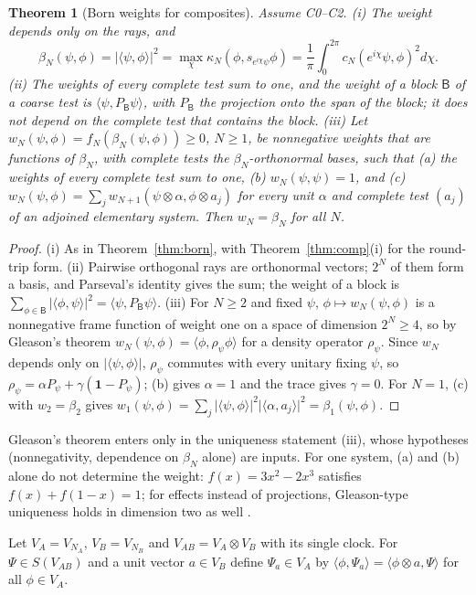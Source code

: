 \documentclass[aps,pra,onecolumn,superscriptaddress,nofootinbib,10pt]{revtex4-2}
\newtheorem{theorem}{Theorem}
\theoremstyle{definition}
\theoremstyle{remark}
\newcommand{\ip}[2]{\langle #1,#2\rangle}
\begin{document}
\begin{theorem}[Born weights for composites]\label{thm:bornN}
Assume C0--C2.
(i) The weight depends only on the rays, and
\[
\beta_N(\psi,\phi)=\lvert\ip{\psi}{\phi}\rvert^2=\max_\chi\kappa_N(\phi,s_{e^{i\chi}\psi}\phi)
=\frac1\pi\int_0^{2\pi}c_N(e^{i\chi}\psi,\phi)^2d\chi .
\]
(ii) The weights of every complete test sum to one, and the weight of a block $\mathsf B$ of a coarse
test is $\ip{\psi}{P_{\mathsf B}\psi}$, with $P_{\mathsf B}$ the projection onto the span of the block; it
does not depend on the complete test that contains the block.
(iii) Let $w_N(\psi,\phi)=f_N(\beta_N(\psi,\phi))\ge0$, $N\ge1$, be nonnegative weights that are functions of
$\beta_N$, with complete tests the $\beta_N$-orthonormal bases, such that (a) the weights of every complete
test sum to one, (b) $w_N(\psi,\psi)=1$, and (c)
$w_N(\psi,\phi)=\sum_jw_{N+1}(\psi\otimes\alpha,\phi\otimes a_j)$ for every unit $\alpha$ and complete test
$(a_j)$ of an adjoined elementary system.  Then $w_N=\beta_N$ for all $N$.
\end{theorem}
\begin{proof}
(i) As in Theorem~\ref{thm:born}, with Theorem~\ref{thm:comp}(i) for the round-trip form.
(ii) Pairwise orthogonal rays are orthonormal vectors; $2^N$ of them form a basis, and Parseval's
identity gives the sum; the weight of a block is $\sum_{\phi\in\mathsf B}\lvert\ip{\phi}{\psi}\rvert^2=
\ip{\psi}{P_{\mathsf B}\psi}$.
(iii) For $N\ge2$ and fixed $\psi$, $\phi\mapsto w_N(\psi,\phi)$ is a nonnegative frame function of
weight one on a space of dimension $2^N\ge4$, so by Gleason's theorem \cite{Gleason57}
$w_N(\psi,\phi)=\ip{\phi}{\rho_\psi\phi}$ for a density operator $\rho_\psi$.  Since $w_N$ depends only on
$\lvert\ip{\psi}{\phi}\rvert$, $\rho_\psi$ commutes with every unitary fixing $\psi$, so
$\rho_\psi=\alpha P_\psi+\gamma(\mathbf1-P_\psi)$; (b) gives $\alpha=1$ and the trace gives $\gamma=0$.
For $N=1$, (c) with $w_2=\beta_2$ gives $w_1(\psi,\phi)=\sum_j\lvert\ip{\psi}{\phi}\rvert^2\lvert\ip{\alpha}{a_j}\rvert^2
=\beta_1(\psi,\phi)$.
\end{proof}
Gleason's theorem enters only in the uniqueness statement (iii), whose hypotheses (nonnegativity,
dependence on $\beta_N$ alone) are inputs.  For one system, (a) and (b) alone do not determine the weight:
$f(x)=3x^2-2x^3$ satisfies $f(x)+f(1-x)=1$; for effects instead of projections, Gleason-type uniqueness
holds in dimension two as well \cite{Busch03,CFMR04}.

Let $V_A=V_{N_A}$, $V_B=V_{N_B}$ and $V_{AB}=V_A\otimes V_B$ with its single clock.  For
$\Psi\in S(V_{AB})$ and a unit vector $a\in V_B$ define $\Psi_a\in V_A$ by
$\ip{\phi}{\Psi_a}=\ip{\phi\otimes a}{\Psi}$ for all $\phi\in V_A$.
\end{document}
